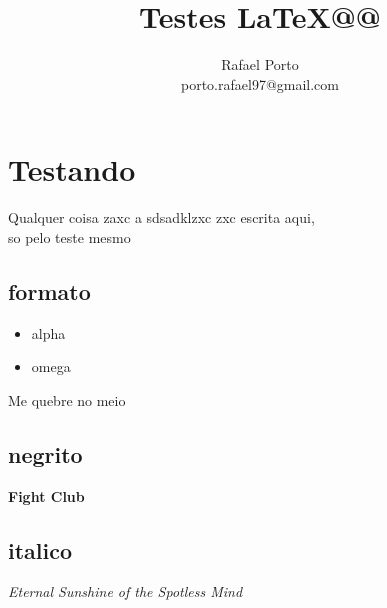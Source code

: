 \documentclass[12pt]{article}
\title{Testes \LaTeX @@}
\author{Rafael Porto \\ porto.rafael97@gmail.com}
\begin{document}
\chapter{Testando}
Qualquer coisa zaxc a sdsadklzxc zxc  escrita aqui, \\ so pelo teste mesmo 

\section{formato}
\begin{itemize}
\item alpha
\item omega
\end{itemize}

Me quebre \newline no meio

\section{negrito}
\textbf{Fight Club}

\section{italico}
\textit{Eternal Sunshine of the Spotless Mind}
\end{document}
